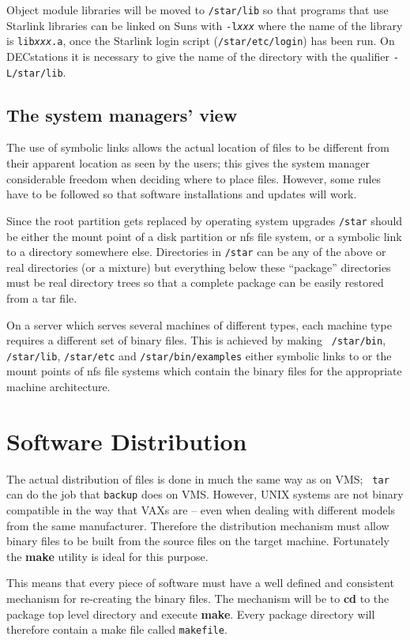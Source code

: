 Object module libraries will be moved to {\tt /star/lib} so that programs that
use Starlink libraries can be linked on Suns with {\tt -l{\em xxx}} where
the name of the library is {\tt lib{\em xxx}.a}, once the Starlink login
script ({\tt /star/etc/login}) has been run. On DECstations it is necessary
to give the name of the directory with the qualifier {\tt -L/star/lib}.

\subsection{The system managers' view}
The use of symbolic links allows the actual location of files to be different
from their apparent location as seen by the users; this gives the system
manager considerable freedom when deciding where to place files. However, some
rules have to be followed so that software installations and updates will
work.

Since the root partition gets replaced by operating system upgrades
{\tt /star} should be
either the mount point of a disk partition or nfs file system, or a symbolic
link to a directory somewhere else. Directories in {\tt /star} can be any of
the above or real directories (or a mixture) but everything below these
``package'' directories must be real directory trees so that a complete package
can be easily restored from a tar file.

On a server which serves several machines of different types, each machine type
requires a different set of binary files. This is achieved by making {\tt
/star/bin}, {\tt /star/lib}, {\tt /star/etc} and {\tt /star/bin/examples}
either symbolic links to or the mount points  of nfs file systems which
contain the binary files for the appropriate machine architecture.

\section{Software Distribution}
The actual distribution of files is done in much the same way as on VMS; {\tt
tar} can do the job that {\tt backup} does on VMS. However, UNIX systems are
not binary compatible in the way that VAXs are -- even when dealing with
different models from the same manufacturer. Therefore the distribution
mechanism must allow binary files to be built from the source files on the
target machine. Fortunately the {\bf make} utility is ideal for this purpose.

This means that every piece of software must have a well defined and consistent
mechanism for re-creating the binary files. The mechanism will be to {\bf cd}
to the package top level directory and execute {\bf make}. Every package
directory will therefore contain a make file called {\tt makefile}.

